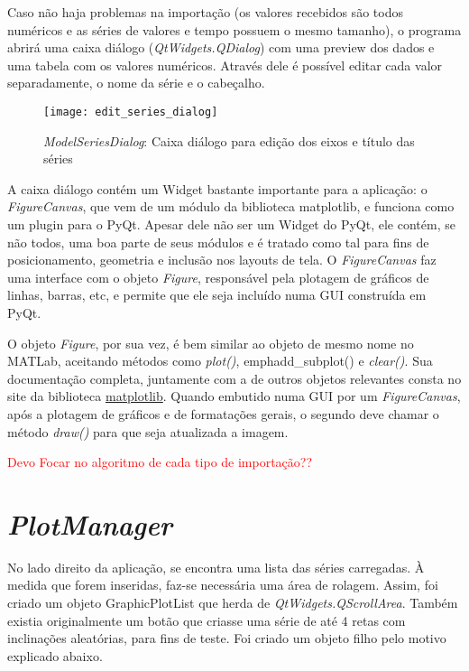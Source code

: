 Caso não haja problemas na importação (os valores recebidos são todos numéricos e as séries de valores e tempo possuem o mesmo tamanho), o programa abrirá uma caixa diálogo (\emph{QtWidgets.QDialog}) com uma preview dos dados e uma tabela com os valores numéricos. Através dele é possível editar cada valor separadamente, o nome da série e o cabeçalho.

\begin{figure}[H]
	\centering
	\texttt{[image: edit\_series\_dialog]}
	\caption{\emph{ModelSeriesDialog}: Caixa diálogo para edição dos eixos e título das séries}
	\label{img_edit_series_dialog}
\end{figure}

A caixa diálogo contém um Widget bastante importante para a aplicação: o \emph{FigureCanvas}, que vem de um módulo da biblioteca matplotlib, e funciona como um plugin para o PyQt. Apesar dele não ser um Widget do PyQt, ele contém, se não todos, uma boa parte de seus módulos e é tratado como tal para fins de posicionamento, geometria e inclusão nos layouts de tela. O \emph{FigureCanvas} faz uma interface com o objeto \emph{Figure}, responsável pela plotagem de gráficos de linhas, barras, etc, e permite que ele seja incluído numa GUI construída em PyQt.

O objeto \emph{Figure}, por sua vez, é bem similar ao objeto de mesmo nome no MATLab, aceitando métodos como \emph{plot()}, emph{add\_subplot()} e \emph{clear()}. Sua documentação completa, juntamente com a de outros objetos relevantes consta no site da biblioteca \href{https://matplotlib.org/}{matplotlib}. Quando embutido numa GUI por um \emph{FigureCanvas}, após a plotagem de gráficos e de formatações gerais, o segundo deve chamar o método \emph{draw()} para que seja atualizada a imagem.

\textcolor{red}{Devo Focar no algoritmo de cada tipo de importação??}

\section{\emph{PlotManager}}

No lado direito da aplicação, se encontra uma lista das séries carregadas. À medida que forem inseridas, faz-se necessária uma área de rolagem. Assim, foi criado um objeto GraphicPlotList que herda de \emph{QtWidgets.QScrollArea}. Também existia originalmente um botão que criasse uma série de até 4 retas com inclinações aleatórias, para fins de teste. Foi criado um objeto filho pelo motivo explicado abaixo.

